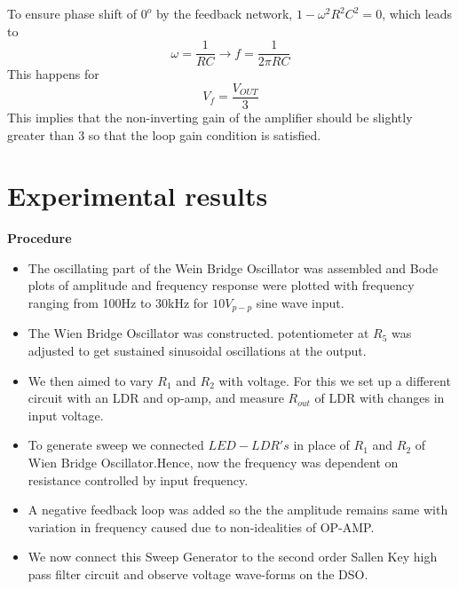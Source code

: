 \documentclass[12pt]{article}
\begin{document}
            \noindent
            To ensure phase shift of $0^o$ by the feedback network, $1 - \omega^2R^2C^2 = 0$, which leads to
            \begin{equation}
                \omega = \frac{1}{RC} \rightarrow f = \frac{1}{2\pi RC}
            \end{equation}
            \noindent
            This happens for
            \begin{equation}
                V_f = \frac{V_{OUT}}{3} 
            \end{equation}
            \noindent
            This implies that the non-inverting gain of the amplifier should be slightly greater than 3 so that the loop gain condition is satisfied.
\section{Experimental results}
    
    \textbf{Procedure}
        \begin{itemize}
            \item The oscillating part of the Wein Bridge Oscillator was assembled and Bode plots of amplitude and frequency response were plotted with frequency ranging from 100Hz to 30kHz for $10V_{p-p}$ sine wave input.
            \item The Wien Bridge Oscillator was constructed. potentiometer at $R_5$ was adjusted to get sustained sinusoidal oscillations at the output. 
            \item  We then aimed to vary  $R_1$ and $R_2$ with voltage. For this we set up a different circuit with an LDR and op-amp, and measure $R_{out}$ of LDR with changes in input voltage.
            \item To generate sweep we connected $LED-LDR's$ in place of $R_1$ and $R_2$ of Wien Bridge Oscillator.Hence, now the frequency was dependent on resistance controlled by input frequency.
            \item  A negative feedback loop was added so the the amplitude remains same with variation in frequency caused due to non-idealities of OP-AMP. 
            \item We now connect this Sweep Generator to the second order Sallen Key high pass filter circuit and observe voltage wave-forms on the DSO.
        \end{itemize}
\end{document}
